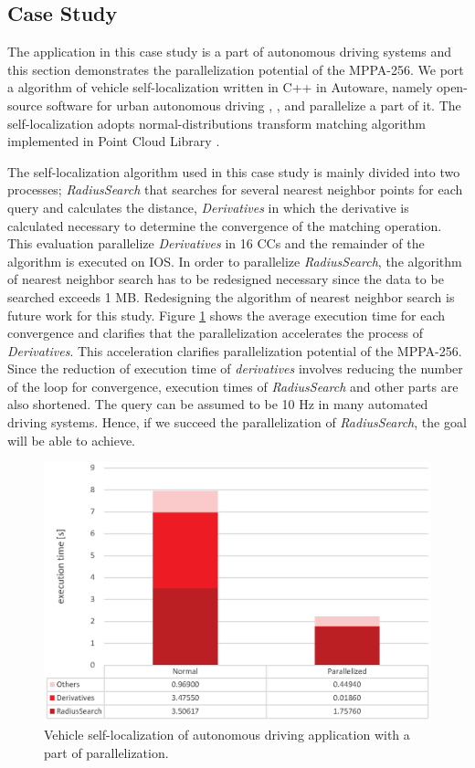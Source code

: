 \documentclass{sig-alternate-05-2015}
\begin{document}
\subsection{Case Study}
\label{sec:case_study}
The application in this case study is a part of autonomous driving systems and this section demonstrates the parallelization potential of the MPPA-256.
We port a algorithm of vehicle self-localization written in C++ in Autoware, namely open-source software for urban autonomous driving \cite{autoware}, \cite{kato2015open}, and parallelize a part of it.
The self-localization adopts normal-distributions transform matching algorithm \cite{magnusson2009three} implemented in Point Cloud Library \cite{pcl}.

The self-localization algorithm used in this case study is mainly divided into two processes; \emph{RadiusSearch} that searches for several nearest neighbor points for each query and calculates the distance, \emph{Derivatives} in which the derivative is calculated necessary to determine the convergence of the matching operation.
This evaluation parallelize \emph{Derivatives} in 16 CCs and the remainder of the algorithm is executed on IOS.
In order to parallelize \emph{RadiusSearch}, the algorithm of nearest neighbor search has to be redesigned necessary since the data to be searched exceeds 1 MB.
Redesigning the algorithm of nearest neighbor search is future work for this study.
Figure \ref{fig:ndt_matching} shows the average execution time for each convergence and clarifies that the parallelization accelerates the process of \emph{Derivatives}.
This acceleration clarifies parallelization potential of the MPPA-256.
Since the reduction of execution time of \emph{derivatives} involves reducing the number of the loop for convergence, execution times of \emph{RadiusSearch} and other parts are also shortened.
The query can be assumed to be 10 Hz in many automated driving systems.
Hence, if we succeed the parallelization of \emph{RadiusSearch}, the goal will be able to achieve.

\begin{figure}[t]
  \centering
  \includegraphics[width=1.0\linewidth]{../figure/BarGraph_ndt_matching.eps}
  \caption{\label{fig:ndt_matching}
   Vehicle self-localization of autonomous driving application with a part of parallelization.}
\end{figure}
\end{document}
